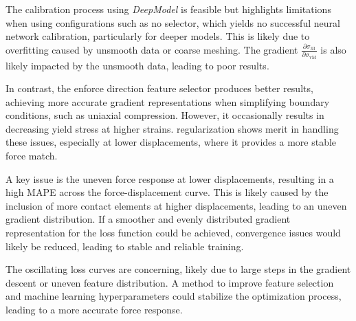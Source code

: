 The calibration process using \textit{DeepModel} is feasible but highlights limitations when using configurations such as no selector, which yields no successful neural network calibration, particularly for deeper models. This is likely due to overfitting caused by unsmooth data or coarse meshing. The gradient 
$\frac{\partial \sigma_{33}}{\partial \sigma_{\text{vM}}}$
is also likely impacted by the unsmooth data, leading to poor results.

In contrast, the enforce direction feature selector produces better results, achieving more accurate gradient representations when simplifying boundary conditions, such as uniaxial compression. However, it occasionally results in decreasing yield stress at higher strains. regularization shows merit in handling these issues, especially at lower displacements, where it provides a more stable force match.

A key issue is the uneven force response at lower displacements, resulting in a high MAPE across the force-displacement curve. This is likely caused by the inclusion of more contact elements at higher displacements, leading to an uneven gradient distribution. If a smoother and evenly distributed gradient representation for the loss function could be achieved, convergence issues would likely be reduced, leading to stable and reliable training.

The oscillating loss curves are concerning, likely due to large steps in the gradient descent or uneven feature distribution. A method to improve feature selection and machine learning hyperparameters could stabilize the optimization process, leading to a more accurate force response.
